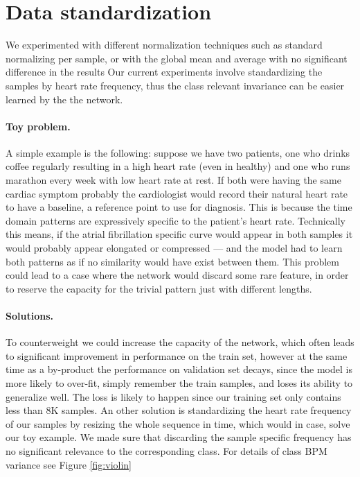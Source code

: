 \section{Data standardization}
We experimented with different normalization techniques such as standard normalizing per sample, or with the global mean and average with no significant difference in the results
Our current experiments involve standardizing the samples by heart rate frequency, thus the class relevant invariance can be easier learned by the the network.

\paragraph{Toy problem.}
A simple example is the following: suppose we have two patients, one who drinks coffee regularly resulting in a high heart rate (even in healthy) and one who runs marathon every week with low heart rate at rest.
If both were having the same cardiac symptom probably the cardiologist would record their natural heart rate to have a baseline, a reference point to use for diagnosis.
This is because the time domain patterns are expressively specific to the patient's heart rate.
Technically this means, if the atrial fibrillation specific curve would appear in both samples it would probably appear elongated or compressed --- and the model had to learn both patterns as if no similarity would have exist between them.
This problem could lead to a case where the network would discard some rare feature, in order to reserve the capacity for the trivial pattern just with different lengths.

\paragraph{Solutions.}
To counterweight we could increase the capacity of the network, which often leads to significant improvement in performance on the train set, however at the same time as a by-product the performance on validation set decays, since the model is more likely to over-fit, simply remember the train samples, and loses its ability to generalize well.
The loss is likely to happen since our training set only contains less than 8K samples.
An other solution is standardizing the heart rate frequency of our samples by resizing the whole sequence in time, which would in case, solve our toy example.
We made sure that discarding the sample specific frequency has no significant relevance to the corresponding class. For details of class BPM variance see Figure \ref{fig:violin}


